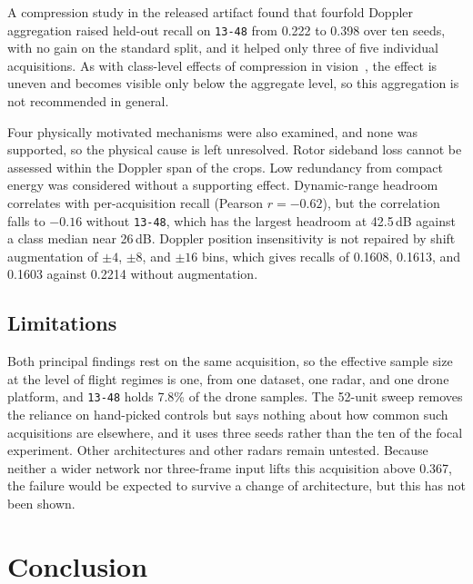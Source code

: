 \documentclass{ICIC2026}
\begin{document}
A compression study in the released artifact found that fourfold Doppler aggregation raised held-out recall on \texttt{13-48} from 0.222 to 0.398 over ten seeds, with no gain on the standard split, and it helped only three of five individual acquisitions. As with class-level effects of compression in vision~\cite{hooker2019,tran2022}, the effect is uneven and becomes visible only below the aggregate level, so this aggregation is not recommended in general.

Four physically motivated mechanisms were also examined, and none was supported, so the physical cause is left unresolved. Rotor sideband loss cannot be assessed within the Doppler span of the crops. Low redundancy from compact energy was considered without a supporting effect. Dynamic-range headroom correlates with per-acquisition recall (Pearson $r=-0.62$), but the correlation falls to $-0.16$ without \texttt{13-48}, which has the largest headroom at 42.5\,dB against a class median near 26\,dB. Doppler position insensitivity is not repaired by shift augmentation of $\pm4$, $\pm8$, and $\pm16$ bins, which gives recalls of 0.1608, 0.1613, and 0.1603 against 0.2214 without augmentation.

\subsection{Limitations}

Both principal findings rest on the same acquisition, so the effective sample size at the level of flight regimes is one, from one dataset, one radar, and one drone platform, and \texttt{13-48} holds 7.8\% of the drone samples. The 52-unit sweep removes the reliance on hand-picked controls but says nothing about how common such acquisitions are elsewhere, and it uses three seeds rather than the ten of the focal experiment. Other architectures and other radars remain untested. Because neither a wider network nor three-frame input lifts this acquisition above 0.367, the failure would be expected to survive a change of architecture, but this has not been shown.

\section{Conclusion}
\end{document}
